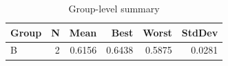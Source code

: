 \begin{table}[htbp]
\centering
\caption{Group-level summary}
\label{tab:group-summary}
\begin{tabular}{lrrrrr}
\toprule
\textbf{Group} & \textbf{N} & \textbf{Mean} & \textbf{Best} & \textbf{Worst} & \textbf{StdDev} \\
\midrule
B & 2 & 0.6156 & 0.6438 & 0.5875 & 0.0281 \\
\bottomrule
\end{tabular}
\end{table}